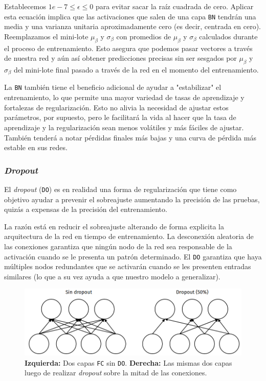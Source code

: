 \documentclass[a4paper,12pt]{article}
\begin{document}
Establecemos $1e-7 \leq \epsilon \leq 0$ para evitar sacar la raíz cuadrada de cero. Aplicar esta ecuación implica que las activaciones que salen de una capa \texttt{BN} tendrán una media y una varianza unitaria aproximadamente cero (es decir, centrada en cero).
Reemplazamos el mini-lote $\mu_{\beta}$ y $\sigma_{\beta}$ con promedios de $\mu_{\beta}$ y $\sigma_{\beta}$ calculados durante el proceso de entrenamiento. Esto asegura que podemos pasar vectores a través de nuestra red y aún así obtener predicciones precisas sin ser sesgados por $\mu_{\beta}$ y $\sigma_{\beta}$ del mini-lote final pasado a través de la red en el momento del entrenamiento. 

\clearpage

La \texttt{BN} también tiene el beneficio adicional de ayudar a "estabilizar" el entrenamiento, lo que permite una mayor variedad de tasas de aprendizaje y fortalezas de regularización. Esto no alivia la necesidad de ajustar estos parámetros, por supuesto, pero le facilitará la vida al hacer que la tasa de aprendizaje y la regularización sean menos volátiles y más fáciles de ajustar. También tenderá a notar pérdidas finales más bajas y una curva de pérdida más estable en sus redes.

\subsubsection{\textit{Dropout}}
El \textit{dropout} (\texttt{DO}) es en realidad una forma de regularización que tiene como objetivo ayudar a prevenir el sobreajuste aumentando la precisión de las pruebas, quizás a expensas de la precisión del entrenamiento. \citep{rosebrock2017deep}

La razón está en reducir el sobreajuste alterando de forma explicita la arquitectura de la red en tiempo de entrenamiento. La desconexión aleatoria de las conexiones garantiza que ningún nodo de la red sea responsable de la activación cuando se le presenta un patrón determinado. El \texttt{DO} garantiza que haya múltiples nodos redundantes que se activarán cuando se les presenten entradas similares (lo que a su vez ayuda a que nuestro modelo a generalizar).

\begin{figure}[H]
	\begin{center}				
		\includegraphics[width=1\textwidth]{tesis_46.png}
		\caption{\textbf{Izquierda:} Dos capas \texttt{FC} sin \texttt{DO}. \textbf{Derecha:} Las mismas dos capas luego de realizar \textit{dropout} sobre la mitad de las conexiones.}
		\label{fig:type-pooling}
	\end{center}
\end{figure}
\end{document}
